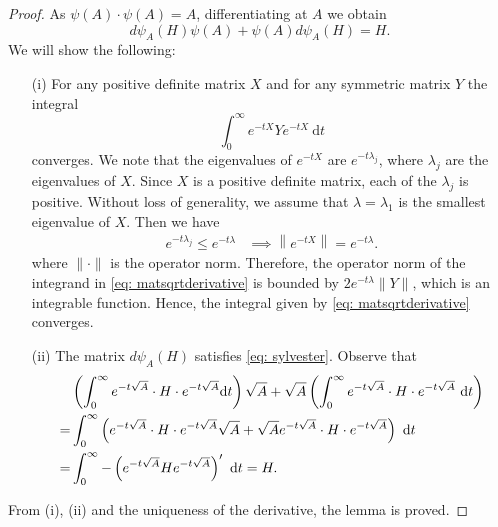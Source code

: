 \begin{proof}
    As $\psi(A)\cdot \psi(A) = A$, differentiating at $A$ we obtain
    \begin{equation}\label{eq: sylvester}
            d\psi_A(H)\psi(A) + \psi(A)d\psi_A(H) = H.
    \end{equation}
    We will show the following:
    \begin{enumerate}
        \item [(i)] For any positive definite matrix $X$ and for any symmetric matrix $Y$ the integral 
        \begin{equation}\label{eq: matsqrtderivative}
            \int_0^\infty e^{-tX}Ye^{-tX}~\mathrm{d}t
        \end{equation}
        converges. We note that the eigenvalues of $e^{-tX}$ are $e^{-t\lambda_j}$, where $\lambda_j$ are the eigenvalues of $X$. Since $X$ is a positive definite matrix, each of the $\lambda_j$ is positive. Without loss of generality, we assume that $\lambda=\lambda_1$ is the smallest eigenvalue of $X$. Then we have
        \begin{align*}
            e^{-t \lambda_j} \le e^{-t \lambda} & \implies \left\|e^{-tX}\right\| = e^{-t \lambda}.
        \end{align*} 
        where  $\|\cdot\|$ is the operator norm.  Therefore, the operator norm of the integrand in \eqref{eq: matsqrtderivative} is bounded by $2e^{-t \lambda}\|Y\|$, which is an integrable function. Hence, the integral given by \eqref{eq: matsqrtderivative} converges. 
    
        \item [(ii)] The matrix $d\psi_A(H)$ satisfies \eqref{eq: sylvester}. Observe that 
        \begin{align*}
                & \left( \int_0^\infty e^{-t\sqrt{A}}\cdot H\cdot e^{-t\sqrt{A}} \mathrm{d}t  \right) \sqrt{A} + \sqrt{A} \left( \int_0^\infty e^{-t\sqrt{A}}\cdot H\cdot e^{-t\sqrt{A}}~\mathrm{d}t \right) 
            \\
            = & \int_0^\infty\left( e^{-t\sqrt{A}}\cdot H\cdot e^{-t\sqrt{A}}  \sqrt{A} + \sqrt{A} e^{-t\sqrt{A}}\cdot H\cdot e^{-t\sqrt{A}} \right)~\mathrm{d}t
            \\
            = & \int_0^\infty-\left( e^{-t\sqrt{A}} H e^{-t\sqrt{A}} \right)'~\mathrm{d}t = H.
        \end{align*}
    \end{enumerate}
    From (i), (ii) and the uniqueness of the derivative, the lemma is proved. 
\end{proof}


